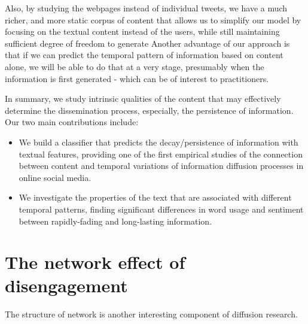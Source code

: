 \documentclass[phd,tocprelim]{cornell}
\begin{document}
Also, by studying the webpages instead of individual tweets, we have a much richer, and more static corpus of content that allows us to simplify our model by focusing on the textual content instead of the users, while still maintaining sufficient degree of freedom to generate Another advantage of our approach is that if we can predict the temporal pattern of information based on content alone, we will be able to do that at a very stage, presumably when the information is first generated - which can be of interest to practitioners. 

In summary, we study intrinsic qualities of the content that may effectively determine the dissemination process, especially, the persistence of information. Our two main contributions include:
\begin{itemize}
\item We build a classifier that predicts the decay/persistence of information with textual features, providing one of the first empirical studies of the connection between content and temporal variations of information diffusion processes in online social media.
\item We investigate the properties of the text that are associated with different temporal patterns, finding significant differences in word usage and sentiment between rapidly-fading and long-lasting information.
\end{itemize}







\section{The network effect of disengagement}
The structure of network is another interesting component of diffusion research. 
\end{document}
